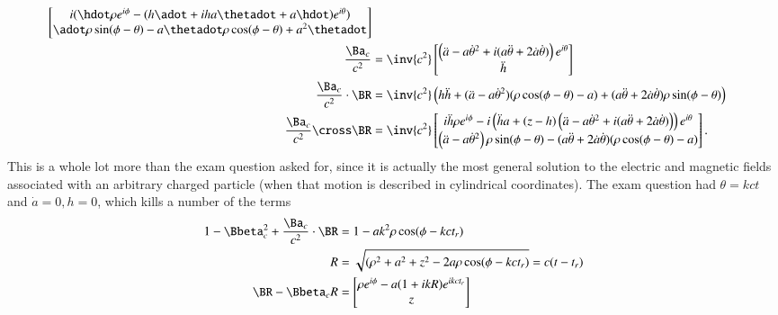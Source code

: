 {\begin{equation}
\begin{aligned}
\begin{bmatrix}
i( \hdot \rho e^{i\phi} - (h \adot + i h a \thetadot + a \hdot) e^{i\theta} ) \\
\adot \rho \sin(\phi - \theta) - a \thetadot \rho \cos(\phi - \theta) + a^2 \thetadot
\end{bmatrix} \\
\frac{\Ba_c}{c^2} &=
\inv{c^2}
\begin{bmatrix}
\left( \ddot{a} - a {\dot{\theta}}^2 + i ( a\ddot{\theta} + 2 \dot{a} \dot{\theta} ) \right) e^{i\theta} \\
\ddot{h}
\end{bmatrix} \\
\frac{\Ba_c}{c^2} \cdot \BR &=
\inv{c^2} \left(
h \ddot{h} +
( \ddot{a} - a {\dot{\theta}}^2 ) (\rho \cos(\phi - \theta) - a)
+ (a \ddot{\theta} + 2 \dot{a} \dot{\theta}) \rho \sin(\phi - \theta) \right) \\
\frac{\Ba_c}{c^2} \cross \BR
&=
\inv{c^2}
\begin{bmatrix}
i \ddot{h} \rho e^{i\phi}
- i \left( \ddot{h} a + (z - h) \left( \ddot{a} - a {\dot{\theta}}^2 + i ( a\ddot{\theta} + 2 \dot{a} \dot{\theta} ) \right) \right) e^{i\theta} \\
\left( \ddot{a} - a {\dot{\theta}}^2 \right) \rho \sin(\phi - \theta)
-( a\ddot{\theta} + 2 \dot{a} \dot{\theta} ) (\rho \cos(\phi -\theta) - a)
\end{bmatrix}.
\end{aligned}
\end{equation}
%
This is a whole lot more than the exam question asked for, since it is actually the most general solution to the electric and magnetic fields associated with an arbitrary charged particle (when that motion is described in cylindrical coordinates).  The exam question had \(\theta = k c t\) and \(\dot{a} = 0, h = 0\), which kills a number of the terms
%
\begin{equation}\label{eqn:relativisticElectrodynamicsExamReflection:1010}
\begin{aligned}
1 - \Bbeta_c^2 + \frac{\Ba_c}{c^2} \cdot \BR &= 1 - a k^2 \rho \cos(\phi -  k c t_r) \\
R &= \sqrt{(\rho^2 + a^2 + z^2 - 2 a \rho \cos(\phi - k c t_r)} = c( t - t_r) \\
\BR - \Bbeta_c R &=
\begin{bmatrix}
\rho e^{i\phi} - a (1 + i k R) e^{i k c t_r} \\
z
\end{bmatrix} \\

\end{aligned}
\end{equation}}

